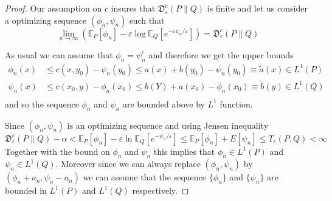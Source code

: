 \documentclass{amsart}
\theoremstyle{definition}
\theoremstyle{remark}
\numberwithin{equation}{section}
\begin{document}
\begin{proof} Our assumption on $c$ insures that $\mathfrak{D}^c_\varepsilon(P\|Q)$ is finite and let us consider a optimizing sequence $(\phi_n,\psi_n)$ such that 
\begin{equation}
    \lim_{n \to \infty} \left(\mathbb{E}_P[\phi_n] -\varepsilon \log \mathbb{E}_Q[e^{-\varepsilon \psi_n/\varepsilon}]\right)= \mathfrak{D}^c_\varepsilon(P \|Q)
\end{equation}



As usual we can assume that $\phi_n=\psi_n^c$ and therefore we get the upper bounds
\begin{equation}
\begin{aligned}
\phi_n(x) &\le c(x,y_0)- \psi_n(y_0) \le a(x) +b(y_0)-\psi_n(y_0) \equiv\tilde{a}(x) \in L^1(P) \\
\psi_n(x) &\le c(x_0,y)- \phi_n(x_0) \le b(Y) +a(x_0)-\phi_n(x_0) \equiv\tilde{b}(y) \in L^1(Q) \\
\end{aligned}
\end{equation}
and so the sequence $\phi_n$ and $\psi_n$ are bounded above by $L^1$ function.  

Since $(\phi_n,\psi_n)$ is an optimizing sequence and using Jensen inequality \begin{equation}
\mathfrak{D}^c_\varepsilon(P\|Q) - \alpha< \mathbb{E}_P[\phi_n] - \varepsilon\ln \mathbb{E}_Q[e^{-\psi_n/\varepsilon}] \le \mathbb{E}_P[\phi_n] + E[\psi_n] \le T_c(P,Q) < \infty
\end{equation}
Together with the bound on $\phi_n$ and $\psi_n$ this implies that $\phi_n \in L^1(P)$ and $\psi_n \in L^1(Q)$.  Moreover since we can always replace $(\phi_n,\psi_n)$ by $(\phi_n + a_n, \psi_n-a_n)$ we can assume that the sequence $\{\phi_n\}$ and $\{\psi_n\}$  are bounded in $L^1(P)$ and $L^1(Q)$ respectively. 





\end{proof}
\end{document}
